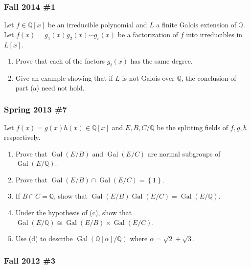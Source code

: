 \hypertarget{fall-2014-1}{%
\subsubsection{Fall 2014 \#1}\label{fall-2014-1}}

Let \(f\in {\mathbb{Q}}[x]\) be an irreducible polynomial and \(L\) a
finite Galois extension of \({\mathbb{Q}}\). Let
\(f(x) = g_1(x)g_2(x)\cdots g_r(x)\) be a factorization of \(f\) into
irreducibles in \(L[x]\).

\begin{enumerate}
\def\labelenumi{\alph{enumi}.}
\item
  Prove that each of the factors \(g_i(x)\) has the same degree.
\item
  Give an example showing that if \(L\) is not Galois over
  \({\mathbb{Q}}\), the conclusion of part (a) need not hold.
\end{enumerate}

\hypertarget{spring-2013-7}{%
\subsubsection{Spring 2013 \#7}\label{spring-2013-7}}

Let \(f(x) = g(x) h(x) \in {\mathbb{Q}}[x]\) and \(E,B,C/{\mathbb{Q}}\)
be the splitting fields of \(f,g,h\) respectively.

\begin{enumerate}
\def\labelenumi{\alph{enumi}.}
\item
  Prove that \({ \operatorname{Gal}} (E/B)\) and
  \({ \operatorname{Gal}} (E/C)\) are normal subgroups of
  \({ \operatorname{Gal}} (E/{\mathbb{Q}})\).
\item
  Prove that
  \({ \operatorname{Gal}} (E/B) \cap{ \operatorname{Gal}} (E/C) = \left\{{1}\right\}\).
\item
  If \(B\cap C = {\mathbb{Q}}\), show that
  \({ \operatorname{Gal}} (E/B) { \operatorname{Gal}} (E/C) = { \operatorname{Gal}} (E/{\mathbb{Q}})\).
\item
  Under the hypothesis of (c), show that
  \({ \operatorname{Gal}} (E/{\mathbb{Q}}) \cong { \operatorname{Gal}} (E/B) \times { \operatorname{Gal}} (E/C)\).
\item
  Use (d) to describe
  \({ \operatorname{Gal}} ({\mathbb{Q}}[\alpha]/{\mathbb{Q}})\) where
  \(\alpha = \sqrt 2 + \sqrt 3\).
\end{enumerate}

\hypertarget{fall-2012-3}{%
\subsubsection{Fall 2012 \#3}\label{fall-2012-3}}


